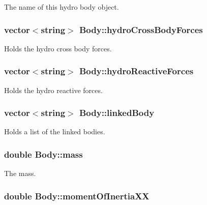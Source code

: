 The name of this hydro body object. \hypertarget{class_body_ad5ab2bc2f00fcb646a27398b0245696d}{
\subsubsection[{hydro\-Cross\-Body\-Forces}]{\setlength{\rightskip}{0pt plus 5cm}vector$<$string$>$ Body\-::hydro\-Cross\-Body\-Forces}}\label{class_body_ad5ab2bc2f00fcb646a27398b0245696d}
Holds the hydro cross body forces. \hypertarget{class_body_a45e72e2a50d93068862b57bf4850a43b}{
\subsubsection[{hydro\-Reactive\-Forces}]{\setlength{\rightskip}{0pt plus 5cm}vector$<$string$>$ Body\-::hydro\-Reactive\-Forces}}\label{class_body_a45e72e2a50d93068862b57bf4850a43b}
Holds the hydro reactive forces. \hypertarget{class_body_aabf9875fae852bd842d4b2b57d25eb73}{
\subsubsection[{linked\-Body}]{\setlength{\rightskip}{0pt plus 5cm}vector$<$string$>$ Body\-::linked\-Body}}\label{class_body_aabf9875fae852bd842d4b2b57d25eb73}
Holds a list of the linked bodies. \hypertarget{class_body_abeaee44e6bc187426a1012bdaacb6eb4}{
\subsubsection[{mass}]{\setlength{\rightskip}{0pt plus 5cm}double Body\-::mass}}\label{class_body_abeaee44e6bc187426a1012bdaacb6eb4}
The mass. \hypertarget{class_body_af29b06cfb14adbd1ad58d10a138a43c4}{
\subsubsection[{moment\-Of\-Inertia\-X\-X}]{\setlength{\rightskip}{0pt plus 5cm}double Body\-::moment\-Of\-Inertia\-X\-X}}\label{class_body_af29b06cfb14adbd1ad58d10a138a43c4}
